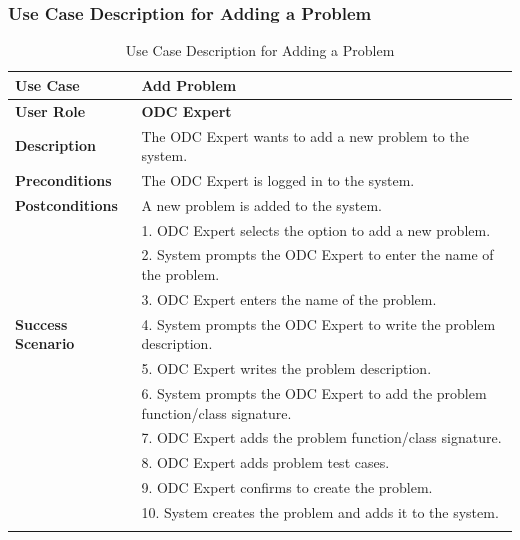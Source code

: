 \subsubsection{Use Case Description for Adding a Problem}
\begin{longtable}{|p{3cm}|p{12cm}|}
  \hline
  \rowcolor{green!20} \textbf{Use Case}      & \textbf{Add Problem}                                                          \\ \hline
  \textbf{User Role}                         & \textbf{ODC Expert}                                                           \\ \hline
  \textbf{Description}                       & The ODC Expert wants to add a new problem to the system.                      \\ \hline
  \textbf{Preconditions}                     & The ODC Expert is logged in to the system.                                    \\ \hline
  \textbf{Postconditions}                    & A new problem is added to the system.                                         \\ \hline
  \multirow{7}{*}{\textbf{Success Scenario}} & 1. ODC Expert selects the option to add a new problem.                        \\ \cline{2-2}
                                             & 2. System prompts the ODC Expert to enter the name of the problem.            \\ \cline{2-2}
                                             & 3. ODC Expert enters the name of the problem.                                 \\ \cline{2-2}
                                             & 4. System prompts the ODC Expert to write the problem description.            \\ \cline{2-2}
                                             & 5. ODC Expert writes the problem description.                                 \\ \cline{2-2}
                                             & 6. System prompts the ODC Expert to add the problem function/class signature. \\ \cline{2-2}
                                             & 7. ODC Expert adds the problem function/class signature.                      \\ \cline{2-2}
                                             & 8. ODC Expert adds problem test cases.                                        \\ \cline{2-2}
                                             & 9. ODC Expert confirms to create the problem.                                 \\ \cline{2-2}
                                             & 10. System creates the problem and adds it to the system.                     \\ \hline
  \caption{Use Case Description for Adding a Problem}\label{tab:add_problem_use_case}
\end{longtable}

